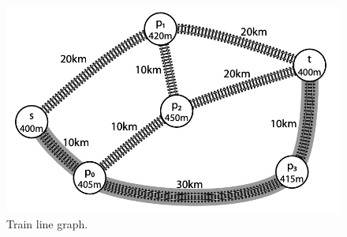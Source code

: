 \begin{figure}
  \centering
  \includegraphics{res/trains.png}
  \caption{Train line graph.}\label{fig:trains}
\end{figure}
